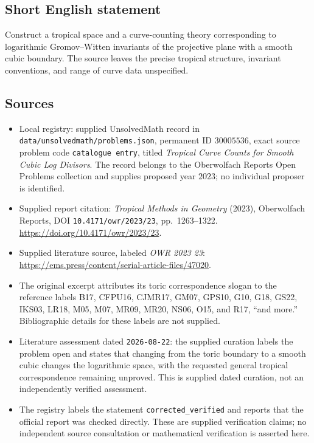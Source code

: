 \documentclass[11pt]{article}
\begin{document}
\subsection{Short English statement}
Construct a tropical space and a curve-counting theory corresponding to logarithmic Gromov--Witten invariants of the projective plane with a smooth cubic boundary. The source leaves the precise tropical structure, invariant conventions, and range of curve data unspecified.
\subsection{Sources}
\begin{itemize}
\item Local registry: supplied UnsolvedMath record in \texttt{data/unsolvedmath/problems.json}, permanent ID \(30005536\), exact source problem code \texttt{catalogue entry}, titled \emph{Tropical Curve Counts for Smooth Cubic Log Divisors}. The record belongs to the Oberwolfach Reports Open Problems collection and supplies proposed year \(2023\); no individual proposer is identified.
\item Supplied report citation: \emph{Tropical Methods in Geometry} (2023), Oberwolfach Reports, DOI \texttt{10.4171/owr/2023/23}, pp.\ 1263--1322. \url{https://doi.org/10.4171/owr/2023/23}.
\item Supplied literature source, labeled \emph{OWR 2023 23}: \url{https://ems.press/content/serial-article-files/47020}.
\item The original excerpt attributes its toric correspondence slogan to the reference labels B17, CFPU16, CJMR17, GM07, GPS10, G10, G18, GS22, IKS03, LR18, M05, M07, MR09, MR20, NS06, O15, and R17, ``and more.'' Bibliographic details for these labels are not supplied.
\item Literature assessment dated \texttt{2026-08-22}: the supplied curation labels the problem open and states that changing from the toric boundary to a smooth cubic changes the logarithmic space, with the requested general tropical correspondence remaining unproved. This is supplied dated curation, not an independently verified assessment.
\item The registry labels the statement \texttt{corrected\_verified} and reports that the official report was checked directly. These are supplied verification claims; no independent source consultation or mathematical verification is asserted here.
\end{itemize}
\end{document}
